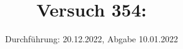 

\title{Versuch 354: }
\date{Durchführung: 20.12.2022, Abgabe 10.01.2022}


\maketitle
\thispagestyle{empty} 
\tableofcontents
\newpage
\setcounter{page}{1}






\printbibliography
\newpage



